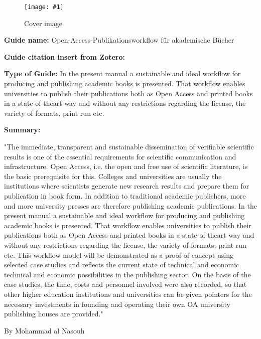 \documentclass{article}
\newlength{\imgwidth}
\newcommand\scaledgraphics[2]{%
                
\settowidth{\imgwidth}{\texttt{[image: \#1]}}%
                
\setlength{\imgwidth}{\minof{\imgwidth}{#2\textwidth}}%
                
\texttt{[image: \#1]}%
                
}
\begin{document}
\begin{center}
\begin{figure}
\scaledgraphics{39363ae5-01d9-4e5a-a46f-bf20971df65a.jpg}{0.5}
\caption*{Cover image}\label{F7674061}
\end{figure}


\end{center}


\textbf{Guide name:}  Open-Access-Publikationsworkflow für akademische Bücher


\textbf{Guide citation insert from Zotero: }\autocite{bohm_open-access-publikationsworkflow_2020}


\textbf{Type of Guide: }In the present manual a sustainable and ideal workflow for producing and publishing academic books is presented. That workflow enables universities to publish their publications both as Open Access and printed books in a state-of-theart way and without any restrictions regarding the license, the variety of formats, print run etc.


\textbf{Summary: }


"The immediate, transparent and sustainable dissemination of verifiable scientific results is one of the essential requirements for scientific communication and infrastructure. Open Access, i.e. the open and free use of scientific literature, is the basic prerequisite for this. Colleges and universities are usually the institutions where scientists generate new research results and prepare them for publication in book form. In addition to traditional academic publishers, more and more university presses are therefore publishing academic publications. In the present manual a sustainable and ideal workflow for producing and publishing academic books is presented. That workflow enables universities to publish their publications both as Open Access and printed books in a state-of-theart way and without any restrictions regarding the license, the variety of formats, print run etc. This workflow model will be demonstrated as a proof of concept using selected case studies and reflects the current state of technical and economic technical and economic possibilities in the publishing sector. On the basis of the case studies, the time, costs and personnel involved were also recorded, so that other higher education institutions and universities can be given pointers for the necessary investments in founding and operating their own OA university publishing houses are provided."


By Mohammad al Nasouh 


\printbibliography[title={Literaturverzeichnis}]
\end{document}
